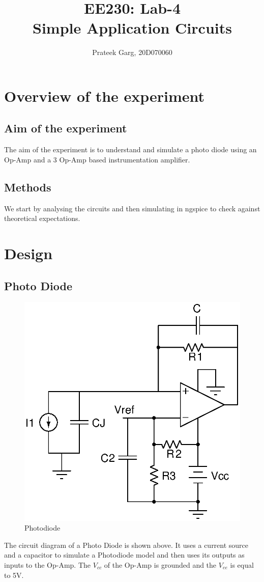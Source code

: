 \documentclass[12pt]{article}
\title{EE230: Lab-4\\
Simple Application Circuits}
\author{Prateek Garg, 20D070060}
\begin{document}
\noindent
\maketitle

\section{Overview of the experiment} %

\subsection{Aim of the experiment}%
The aim of the experiment is to understand and simulate a photo diode using an Op-Amp and a 3 Op-Amp based instrumentation amplifier.
\subsection{Methods}
We start by analysing the circuits and then simulating in ngspice to check against theoretical expectations.  
\section{Design}
\subsection*{Photo Diode}
\begin{figure}[H]
    \centering
    \includegraphics{photodiode.eps}
    \caption{Photodiode}
\end{figure}
The circuit diagram of a Photo Diode is shown above. It uses a current source and a capacitor to simulate a Photodiode model and then uses its outputs as inputs to the Op-Amp.\newline
The $V_{cc}$ of the Op-Amp is grounded and the $V_{ee}$ is equal to 5V.
\end{document}
